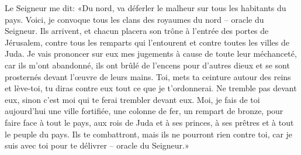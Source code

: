 Le Seigneur me dit:
	«Du nord, va déferler le malheur sur tous les habitants du pays.
Voici, je convoque tous les clans des royaumes du nord – oracle du Seigneur.
Ils arrivent, et chacun placera son trône à l’entrée des portes de Jérusalem,
	contre tous les remparts qui l’entourent
	et contre toutes les villes de Juda.
Je vais prononcer sur eux mes jugements à cause de toute leur méchanceté,
	car ils m’ont abandonné, ils ont brûlé de l’encens pour d’autres dieux
	et se sont prosternés devant l’œuvre de leurs mains.
Toi, mets ta ceinture autour des reins et lève-toi,
	tu diras contre eux tout ce que je t’ordonnerai.
Ne tremble pas devant eux, sinon c’est moi qui te ferai trembler devant eux.
Moi, je fais de toi aujourd’hui une ville fortifiée,
	une colonne de fer, un rempart de bronze,
	pour faire face à tout le pays,
	aux rois de Juda et à ses princes,
	à ses prêtres et à tout le peuple du pays.
Ils te combattront, mais ils ne pourront rien contre toi,
	car je suis avec toi pour te délivrer – oracle du Seigneur.»
